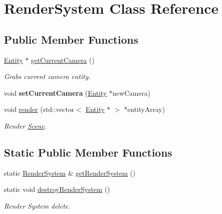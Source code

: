 \hypertarget{class_render_system}{}\section{Render\+System Class Reference}
\label{class_render_system}
\subsection*{Public Member Functions}
\begin{DoxyCompactItemize}
\item 
\hyperlink{class_entity}{Entity} $\ast$ \hyperlink{class_render_system_a9e564b1fdbc1f2b192786565108604a9}{get\+Current\+Camera} ()
\begin{DoxyCompactList}\small\item\em Grabs current camera entity. \end{DoxyCompactList}\item 
\hypertarget{class_render_system_a29ddcb343529a9b6454508527f57845f}{}void {\bfseries set\+Current\+Camera} (\hyperlink{class_entity}{Entity} $\ast$new\+Camera)\label{class_render_system_a29ddcb343529a9b6454508527f57845f}

\item 
void \hyperlink{class_render_system_a0ac3f7e1df83b3a44a6c4830d38bdd5e}{render} (std\+::vector$<$ \hyperlink{class_entity}{Entity} $\ast$ $>$ $\ast$entity\+Array)
\begin{DoxyCompactList}\small\item\em Render \hyperlink{class_scene}{Scene}. \end{DoxyCompactList}\end{DoxyCompactItemize}
\subsection*{Static Public Member Functions}
\begin{DoxyCompactItemize}
\item 
static \hyperlink{class_render_system}{Render\+System} \& \hyperlink{class_render_system_a5e81ee19719a17b1ea8619305375d281}{get\+Render\+System} ()
\item 
static void \hyperlink{class_render_system_ae9cf102fb529432575d0df662d115ea9}{destroy\+Render\+System} ()
\begin{DoxyCompactList}\small\item\em Render System delete. \end{DoxyCompactList}\end{DoxyCompactItemize}



